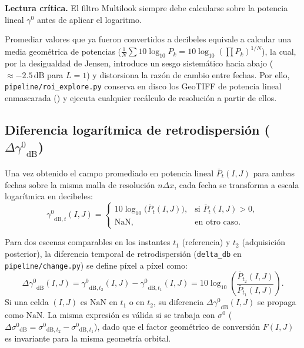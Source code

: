 \documentclass[11pt,a4paper]{article}
\newcommand{\src}[1]{\nolinkurl{#1}}
\newcommand{\unit}[1]{\mathrm{#1}}
\newcommand{\warn}[1]{\par\noindent\colorbox{blue!8}{\parbox{.965\linewidth}{\textbf{Lectura crítica.} #1}}\par}
\newcommand{\gz}{\ensuremath{\gamma^{0}}}
\newcommand{\sz}{\ensuremath{\sigma^{0}}}
\begin{document}
\begin{cuidado}
\warn{El filtro Multilook siempre debe calcularse sobre la potencia lineal $\gz$ antes de aplicar el logaritmo.}
Promediar valores que ya fueron convertidos a decibeles equivale a calcular una media geométrica de potencias
($\frac{1}{N}\sum 10\log_{10} P_k = 10\log_{10}(\prod P_k)^{1/N}$), la cual, por la desigualdad de Jensen,
introduce un sesgo sistemático hacia abajo ($\approx -2.5\,\unit{dB}$ para $L=1$) y distorsiona la razón de
cambio entre fechas. Por ello, \src{pipeline/roi_explore.py} conserva en disco los GeoTIFF de potencia lineal
enmascarada () y ejecuta cualquier recálculo de resolución a
partir de ellos.
\end{cuidado}

\subsection{Diferencia logarítmica de retrodispersión ($\Delta\gz_{\mathrm{dB}}$)}
\label{subsec:cambio-delta-db}

Una vez obtenido el campo promediado en potencia lineal $\bar{P}_t(I,J)$ para ambas fechas sobre la misma malla
de resolución $n\Delta x$, cada fecha se transforma a escala logarítmica en decibeles:
\begin{equation}
  \gz_{\mathrm{dB},t}(I,J) =
  \begin{cases}
    10\log_{10}\!\bigl(\bar{P}_t(I,J)\bigr), & \text{si } \bar{P}_t(I,J) > 0, \\
    \mathrm{NaN}, & \text{en otro caso.}
  \end{cases}
  \label{eq:cambio-a-db}
\end{equation}

Para dos escenas comparables en los instantes $t_1$ (referencia) y $t_2$ (adquisición posterior), la diferencia
temporal de retrodispersión (\texttt{delta\_db} en \src{pipeline/change.py}) se define píxel a píxel como:
\begin{equation}
  \Delta\gz_{\mathrm{dB}}(I,J) = \gz_{\mathrm{dB},t_2}(I,J) - \gz_{\mathrm{dB},t_1}(I,J)
  = 10\log_{10}\!\left(\frac{\bar{P}_{t_2}(I,J)}{\bar{P}_{t_1}(I,J)}\right).
  \label{eq:delta}
\end{equation}
Si una celda $(I,J)$ es $\mathrm{NaN}$ en $t_1$ o en $t_2$, su diferencia $\Delta\gz_{\mathrm{dB}}(I,J)$ se
propaga como $\mathrm{NaN}$. La misma expresión es válida si se trabaja con $\sz$ ($\Delta\sz_{\mathrm{dB}} =
\sz_{\mathrm{dB},t_2} - \sz_{\mathrm{dB},t_1}$), dado que el factor geométrico de conversión $F(I,J)$ es
invariante para la misma geometría orbital.
\end{document}
